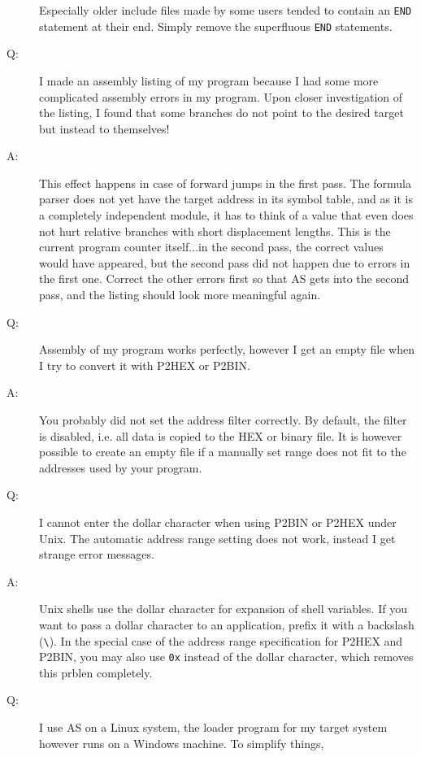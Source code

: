 \documentclass[12pt,twoside]{report}
\newcommand{\tty}[1]{{\tt #1}}
\begin{document}
\begin{description}
{   Especially older include files made by some users tended to
   contain an \tty{END} statement at their end.  Simply remove the
   superfluous \tty{END} statements.}
\vspace{0.3cm}
\item[Q:]{I made an assembly listing of my program because I had some more
   complicated assembly errors in my program.  Upon closer
   investigation of the listing, I found that some branches do not
   point to the desired target but instead to themselves!}
\item[A:]{This effect happens in case of forward jumps in the first pass.
   The formula parser does not yet have the target address in its symbol
   table, and as it is a completely independent module, it has to think of
   a value that even does not hurt relative branches with short displacement
   lengths.  This is the current program counter itself...in the
   second pass, the correct values would have appeared, but the second
   pass did not happen due to errors in the first one.  Correct the
   other errors first so that AS gets into the second pass, and the
   listing should look more meaningful again.}
\vspace{0.3cm}
\item[Q:]{Assembly of my program works perfectly, however I get an empty
   file when I try to convert it with P2HEX or P2BIN.}
\item[A:]{You probably did not set the address filter correctly.  By
   default, the filter is disabled, i.e. all data is copied to the
   HEX or binary file.  It is however possible to create an empty file
   if a manually set range does not fit to the addresses used by your
   program.}
\vspace{0.3cm}
\item[Q:]{I cannot enter the dollar character when using P2BIN or P2HEX
   under Unix.  The automatic address range setting does not work, instead
   I get strange error messages.}
\item[A:]{Unix shells use the dollar character for expansion of shell
   variables.  If you want to pass a dollar character to an application,
   prefix it with a backslash (\verb!\!).  In the special case of the
   address range specification for P2HEX and P2BIN, you may also use
   \tty{0x} instead of the dollar character, which removes this prblen
   completely.}
\item[Q:]{I use AS on a Linux system, the loader program for my target
          system however runs on a Windows machine. To simplify things,
}
\end{description}
\end{document}

